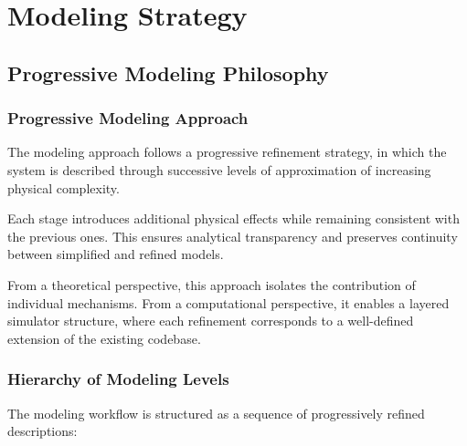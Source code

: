 
\chapter{Modeling Strategy}


\section{Progressive Modeling Philosophy}


\subsection{Progressive Modeling Approach}

The modeling approach follows a progressive refinement strategy, in which the system is described through successive levels of approximation of increasing physical complexity.

Each stage introduces additional physical effects while remaining consistent with the previous ones. This ensures analytical transparency and preserves continuity between simplified and refined models.

\medskip

From a theoretical perspective, this approach isolates the contribution of individual mechanisms. From a computational perspective, it enables a layered simulator structure, where each refinement corresponds to a well-defined extension of the existing codebase.


\subsection{Hierarchy of Modeling Levels}

The modeling workflow is structured as a sequence of progressively refined descriptions:

